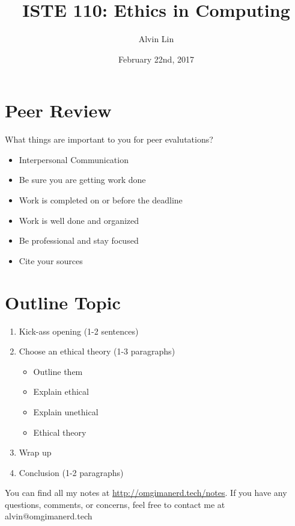 \documentclass[letterpaper, 12pt]{article}
\title{ISTE 110: Ethics in Computing}
\author{Alvin Lin}
\date{February 22nd, 2017}
\begin{document}
\maketitle

\section*{Peer Review}
What things are important to you for peer evalutations?
\begin{itemize}
  \item Interpersonal Communication
  \item Be sure you are getting work done
  \item Work is completed on or before the deadline
  \item Work is well done and organized
  \item Be professional and stay focused
  \item Cite your sources
\end{itemize}

\section*{Outline Topic}
\begin{enumerate}
  \item Kick-ass opening (1-2 sentences)
  \item Choose an ethical theory (1-3 paragraphs)
  \begin{itemize}
    \item Outline them
    \item Explain ethical
    \item Explain unethical
    \item Ethical theory
  \end{itemize}
  \item Wrap up
  \item Conclusion (1-2 paragraphs)
\end{enumerate}

\begin{center}
  You can find all my notes at \url{http://omgimanerd.tech/notes}. If you have
  any questions, comments, or concerns, feel free to contact me at
  alvin@omgimanerd.tech
\end{center}
\end{document}
